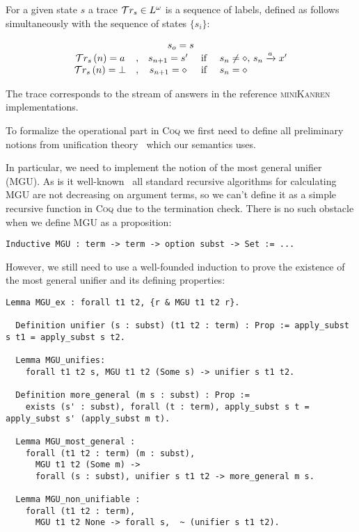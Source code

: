 For a given state $s$ a trace $\mathcal{T}r_{s}\in L^\omega$ is a sequence of labels, defined as follows simultaneously with the sequence of states $\{s_i\}$:

\[
\begin{array}{ccccl}
  \multicolumn{5}{c}{s_o=s}\\
  \tr{s}\,(n)=a &,& s_{n+1}=s'&\mbox{ if }& s_n\ne\diamond,\, s_n\xrightarrow{a} x'\\
  \tr{s}\,(n)=\bot&,&s_{n+1}=\diamond&\mbox{ if }& s_n=\diamond
\end{array}
\]

The trace corresponds to the stream of answers in the reference \textsc{miniKanren} implementations.

To formalize the operational part in \textsc{Coq} we first need to define all preliminary notions from unification theory~\cite{Unification} which our semantics uses.

In particular, we need to implement the notion of the most general unifier (MGU). As is it well-known~\cite{UnificationMcBride} all standard recursive algorithms for calculating
MGU are not decreasing on argument terms, so we can't define it as a simple recursive function in \textsc{Coq} due to the termination check. There is no such obstacle when we define
MGU as a proposition:

\begin{lstlisting}[language=Coq]
  Inductive MGU : term -> term -> option subst -> Set := ...
\end{lstlisting}

However, we still need to use a well-founded induction to prove the existence of the most general unifier and its defining properties:

\begin{lstlisting}[language=Coq]
  Lemma MGU_ex : forall t1 t2, {r & MGU t1 t2 r}.
  
  Definition unifier (s : subst) (t1 t2 : term) : Prop := apply_subst s t1 = apply_subst s t2.

  Lemma MGU_unifies:
    forall t1 t2 s, MGU t1 t2 (Some s) -> unifier s t1 t2.
  
  Definition more_general (m s : subst) : Prop :=
    exists (s' : subst), forall (t : term), apply_subst s t = apply_subst s' (apply_subst m t).

  Lemma MGU_most_general :
    forall (t1 t2 : term) (m : subst),
      MGU t1 t2 (Some m) ->
      forall (s : subst), unifier s t1 t2 -> more_general m s.

  Lemma MGU_non_unifiable :
    forall (t1 t2 : term),
      MGU t1 t2 None -> forall s,  ~ (unifier s t1 t2).
\end{lstlisting}


